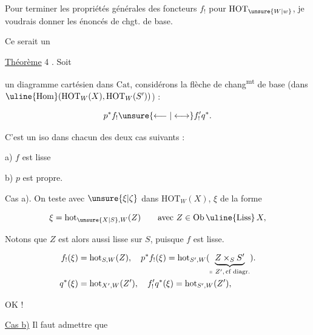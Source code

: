 
Pour terminer les propriétés générales des foncteurs $f_!$ pour $\mathrm{HOT}_{\unsure{W|w}}$, je voudrais donner les énoncés  de chgt. de base.

Ce serait un

\uline{Théorème}  4 . Soit


un diagramme cartésien dans $\mathrm{Cat}$, considérons la flèche de chang\textsuperscript{mt} de base (dans $\uline{\mathrm{Hom}}(\mathrm{HOT}_W(X),\mathrm{HOT}_W(S'))$) :

\[
 p^*f_!\unsure{\longleftarrow|\longleftrightarrow}f'_!q^*.
\]

C'est un iso dans chacun des deux cas suivants :

a) $f$ est  lisse

b) $p$ est propre.



\uline{} Cas a). On teste avec $\unsure{\xi|\zeta}$ dans $\mathrm{HOT}_W(X)$,  $\xi$ de la forme

\[
 \xi=\mathrm{hot}_{\unsure{X|S},W}(Z)\qquad\text{avec }Z\in\mathrm{Ob}\,\uline{\mathrm{Liss}}\,X,
\]

Notons que $Z$ est alors aussi lisse sur $S$, puisque $f$ est lisse.

\[
\begin{aligned}
 f_!(\xi)&=\mathrm{hot}_{S,W}(Z),\quad p^*f_!(\xi)=\mathrm{hot}_{S',W}(\underbrace{Z\times_S S'}_{\shortparallel\ Z',\,\text{cf diagr.}}).\\
 q^*(\xi)&=\mathrm{hot}_{X',W}(Z'),\quad f'_!q^*(\xi)=\mathrm{hot}_{S',W}(Z'),
\end{aligned}
\]


OK !

\uline{Cas b)} Il faut admettre que

